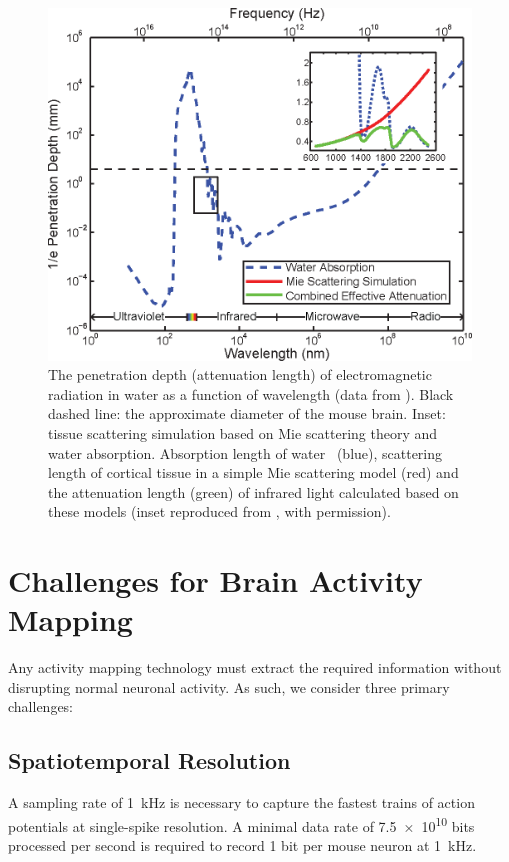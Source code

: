 \begin{figure}[htbp]
\caption{%
The penetration depth (attenuation length) of electromagnetic radiation in water as a function of wavelength (data from \cite{jonasz07}).
Black dashed line: the approximate diameter of the mouse brain.
Inset: tissue scattering simulation based on Mie scattering theory and water absorption. Absorption length of water~\cite{kou93} (blue), scattering length of cortical tissue in a simple Mie scattering model (red) and the attenuation length (green) of infrared light calculated based on these models (inset reproduced from \cite{kou93}, with permission).}
\label{fig:attenuation}
\centering
\includegraphics[width=0.5\linewidth]{figs/Fig2.eps}
\end{figure}

\section{Challenges for Brain Activity Mapping}
\label{sec:challenges}
Any activity mapping technology must extract the required information without disrupting normal neuronal activity.
As such, we consider three primary challenges:

\subsection{Spatiotemporal Resolution}

A sampling rate of \SI{1}{\kilo\hertz} is necessary to capture the fastest trains of action potentials at single-spike resolution.
A minimal data rate of \num{7.5e10} bits processed per second is required to record 1 bit per mouse neuron at \SI{1}{\kilo\hertz}.

